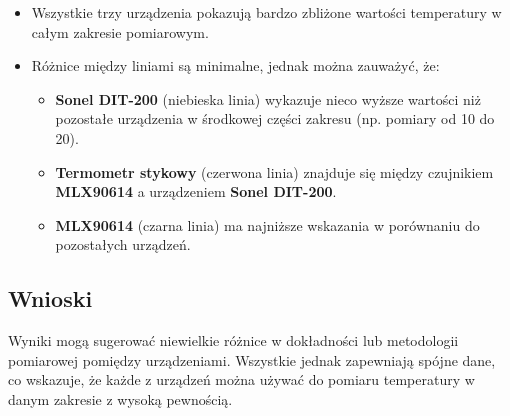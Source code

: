     \begin{itemize}
        \item Wszystkie trzy urządzenia pokazują bardzo zbliżone wartości temperatury w całym zakresie pomiarowym.
        \item Różnice między liniami są minimalne, jednak można zauważyć, że:
        \begin{itemize}
            \item \textbf{Sonel DIT-200} (niebieska linia) wykazuje nieco wyższe wartości niż pozostałe urządzenia w środkowej części zakresu (np. pomiary od 10 do 20).
            \item \textbf{Termometr stykowy} (czerwona linia) znajduje się między czujnikiem \textbf{MLX90614} a urządzeniem \textbf{Sonel DIT-200}.
            \item \textbf{MLX90614} (czarna linia) ma najniższe wskazania w porównaniu do pozostałych urządzeń.
        \end{itemize}
    \end{itemize}
    
    \subsection*{Wnioski}
    
    Wyniki mogą sugerować niewielkie różnice w dokładności lub metodologii pomiarowej pomiędzy urządzeniami. Wszystkie jednak zapewniają spójne dane, co wskazuje, że każde z urządzeń można używać do pomiaru temperatury w danym zakresie z wysoką pewnością.
    


